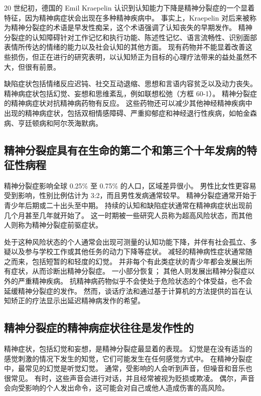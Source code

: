 20 世纪初，德国的 Emil Kraepelin 认识到认知能力下降是精神分裂症的一个显着特征，因为精神病症状会出现在多种精神疾病中。
事实上，Kraepelin 对后来被称为精神分裂症的术语是早发性痴呆，这个术语强调了认知丧失的早期发作。
精神分裂症的认知障碍针对工作记忆和执行功能、陈述性记忆、语言流畅性、识别面部表情所传达的情绪的能力以及社会认知的其他方面。
现有药物并不能显着改善这些损伤，但正在进行的研究表明，以认知矫正为目标的心理疗法带来的益处虽然不大，但很有前景。


缺陷症状包括情绪反应迟钝、社交互动退缩、思想和言语内容贫乏以及动力丧失。
精神病症状包括幻觉、妄想和思维紊乱，例如联想松弛（方框 60-1）。
精神分裂症的精神病症状对抗精神病药物有反应。
这些药物还可以减少其他神经精神疾病中出现的精神病症状，包括双相情感障碍、严重抑郁症和神经退行性疾病，如帕金森病、亨廷顿病和阿尔茨海默病。



\subsection{精神分裂症具有在生命的第二个和第三个十年发病的特征性病程}

精神分裂症影响全球 0.25\% 至 0.75\% 的人口，区域差异很小。
男性比女性更容易受到影响，性别比例估计为 3:2，而且男性发病通常较早。
精神分裂症通常开始于青少年后期或二十出头至中期。
持续的认知和缺陷症状通常在精神病症状出现前几个月甚至几年就开始了。
这一时期被一些研究人员称为超高风险状态，而其他人则称为精神分裂症前驱症状。


处于这种风险状态的个人通常会出现可测量的认知功能下降，并伴有社会孤立、多疑以及参与学校工作或其他任务的动力下降等症状。
减轻的精神病性症状通常随之而来，包括短暂的和轻度的幻觉。
并非每个有此类症状的青少年都会发展出所有症状，从而诊断出精神分裂症。
一小部分恢复；
其他人则发展出精神分裂症以外的严重精神疾病。
抗精神病药物似乎不会使处于危险状态的个体受益，也不会延缓精神分裂症的发作。
然而，谈话疗法和通过基于计算机的方法提供的旨在认知矫正的疗法显示出延迟精神病发作的希望。



\subsection{精神分裂症的精神病症状往往是发作性的}

精神症状，包括幻觉和妄想，是精神分裂症最显着的表现。
幻觉是在没有适当的感觉刺激的情况下发生的知觉，它们可能发生在任何感觉方式中。
在精神分裂症中，最常见的幻觉是听觉幻觉。
通常，受影响的人会听到声音，但噪音和音乐也很常见。
有时，这些声音会进行对话，并且经常被视为贬损或欺凌。
偶尔，声音会向受影响的个人发出命令，这可能会对自己或他人造成伤害的高风险。



